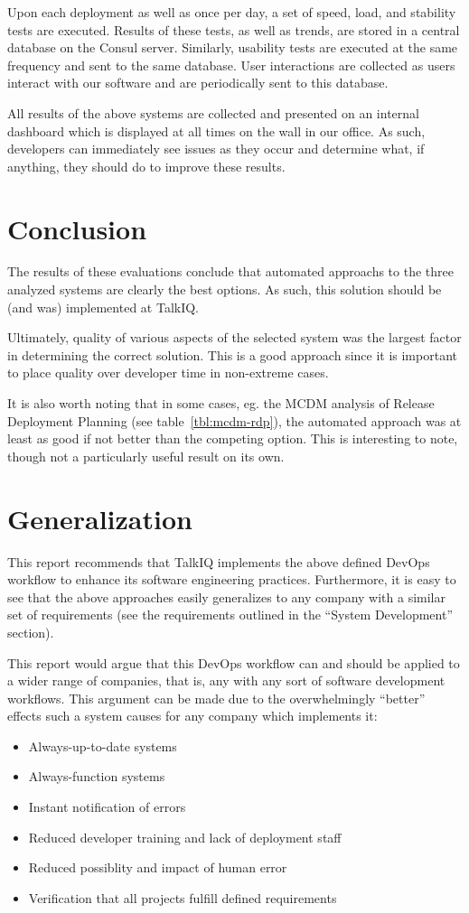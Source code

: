 \documentclass[12pt]{article}
\begin{document}
Upon each deployment as well as once per day, a set of speed, load, and stability tests are executed. Results of these tests, as well as trends, are stored in a central database on the Consul server. Similarly, usability tests are executed at the same frequency and sent to the same database. User interactions are collected as users interact with our software and are periodically sent to this database.

All results of the above systems are collected and presented on an internal dashboard which is displayed at all times on the wall in our office. As such, developers can immediately see issues as they occur and determine what, if anything, they should do to improve these results.
\newpage


\section{Conclusion}
The results of these evaluations conclude that automated approachs to the three analyzed systems are clearly the best options. As such, this solution should be (and was) implemented at TalkIQ.

Ultimately, quality of various aspects of the selected system was the largest factor in determining the correct solution. This is a good approach since it is important to place quality over developer time in non-extreme cases.

It is also worth noting that in some cases, eg. the MCDM analysis of Release Deployment Planning (see table~\ref{tbl:mcdm-rdp}), the automated approach was at least as good if not better than the competing option. This is interesting to note, though not a particularly useful result on its own.
\newpage


\section{Generalization}
This report recommends that TalkIQ implements the above defined DevOps workflow to enhance its software engineering practices. Furthermore, it is easy to see that the above approaches easily generalizes to any company with a similar set of requirements (see the requirements outlined in the ``System Development'' section).

This report would argue that this DevOps workflow can and should be applied to a wider range of companies, that is, any with any sort of software development workflows. This argument can be made due to the overwhelmingly ``better'' effects such a system causes for any company which implements it:
\begin{itemize}
\item Always-up-to-date systems
\item Always-function systems
\item Instant notification of errors
\item Reduced developer training and lack of deployment staff
\item Reduced possiblity and impact of human error
\item Verification that all projects fulfill defined requirements
\end{itemize}
\end{document}

